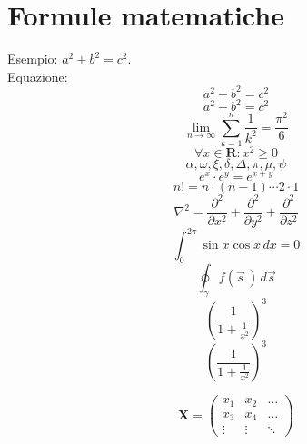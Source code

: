 \documentclass[a4paper, 12pt]{article} %
\theoremstyle{plain} %
\begin{document}
\section{Formule matematiche}
Esempio: $a^2 + b^2 = c^2$. \\
Equazione:
\begin{equation} %
    a^2 + b^2 = c^2
\end{equation}
\begin{equation*} %
    a^2 + b^2 = c^2
\end{equation*}
\begin{equation}
    \lim_{n \to \infty} \sum_{k=1}^n \frac{1}{k^2} = \frac{\pi ^2}{6}
\end{equation}
\begin{equation}
    \forall x \in \mathbf{R}: x^2 \geq 0
\end{equation} %
\begin{equation}
    \alpha, \omega, \xi, \delta, \Delta, \pi, \mu, \psi
\end{equation}
\begin{equation}
    e^x \cdot e^y = e^{x+y}
\end{equation}
\begin{equation}
    n! = n\cdot (n-1) \cdots 2 \cdot 1
\end{equation}
\begin{equation}
    \nabla^2 = \frac{\partial^2}{\partial x^2} + \frac{\partial^2}{\partial y^2} + \frac{\partial^2}{\partial z^2}
\end{equation}
\begin{equation}
    \int_0^{2\pi} \sin x \cos x \,dx = 0
\end{equation}
\begin{equation} %
    \oint_{\gamma} f(\vec{s}\,) \,d\vec{s}
\end{equation}
\begin{equation}
    (\frac{1}{1+\frac{1}{x^2}})^3
\end{equation}
\begin{equation}
    \left( \frac{1}{1+\frac{1}{x^2}} \right) ^3
\end{equation}

\begin{equation}
    \mathbf{X} = \left( 
    \begin{array}{ccc}
    x_1 & x_2 & \ldots \\
    x_3 & x_4 & \ldots \\
    \vdots & \vdots & \ddots 
    \end{array} \right)
\end{equation}
\end{document}

